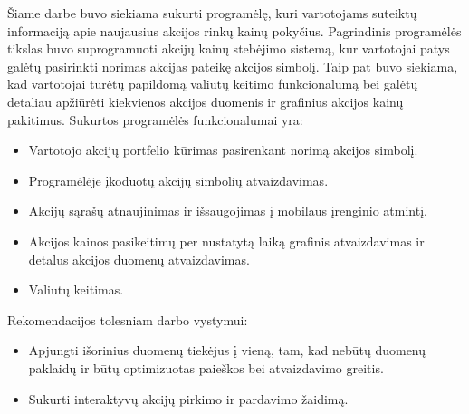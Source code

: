 Šiame darbe buvo siekiama sukurti programėlę, kuri vartotojams suteiktų informaciją apie naujausius akcijos rinkų kainų pokyčius. Pagrindinis programėlės tikslas buvo suprogramuoti akcijų kainų stebėjimo sistemą, kur vartotojai patys galėtų pasirinkti norimas akcijas pateikę akcijos simbolį. Taip pat buvo siekiama, kad vartotojai turėtų papildomą valiutų keitimo funkcionalumą bei galėtų detaliau apžiūrėti kiekvienos akcijos duomenis ir grafinius akcijos kainų pakitimus. Sukurtos programėlės funkcionalumai yra:
\begin{itemize}
	\item Vartotojo akcijų portfelio kūrimas pasirenkant norimą akcijos simbolį.
	\item Programėlėje įkoduotų akcijų simbolių atvaizdavimas.
	\item Akcijų sąrašų atnaujinimas ir išsaugojimas į mobilaus įrenginio atmintį.
	\item Akcijos kainos pasikeitimų per nustatytą laiką grafinis atvaizdavimas ir detalus akcijos duomenų atvaizdavimas.
	\item Valiutų keitimas.
\end{itemize}
Rekomendacijos tolesniam darbo vystymui:
\begin{itemize}
	\item Apjungti išorinius duomenų tiekėjus į vieną, tam, kad nebūtų duomenų paklaidų ir būtų optimizuotas paieškos bei atvaizdavimo greitis.
	\item Sukurti interaktyvų akcijų pirkimo ir pardavimo žaidimą.
\end{itemize}
